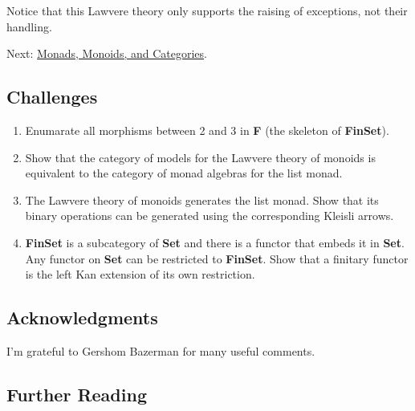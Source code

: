 Notice that this Lawvere theory only supports the raising of exceptions,
not their handling.

Next:
\href{https://bartoszmilewski.com/2017/09/06/monads-monoids-and-categories/}{Monads,
Monoids, and Categories}.

\subsection{Challenges}\label{challenges}

\begin{enumerate}
\tightlist
\item
  Enumarate all morphisms between 2 and 3 in \textbf{F} (the skeleton of
  \textbf{FinSet}).
\item
  Show that the category of models for the Lawvere theory of monoids is
  equivalent to the category of monad algebras for the list monad.
\item
  The Lawvere theory of monoids generates the list monad. Show that its
  binary operations can be generated using the corresponding Kleisli
  arrows.
\item
  \textbf{FinSet} is a subcategory of \textbf{Set} and there is a
  functor that embeds it in \textbf{Set}. Any functor on \textbf{Set}
  can be restricted to \textbf{FinSet}. Show that a finitary functor is
  the left Kan extension of its own restriction.
\end{enumerate}

\subsection{Acknowledgments}\label{acknowledgments}

I'm grateful to Gershom Bazerman for many useful comments.

\subsection{Further Reading}\label{further-reading}

